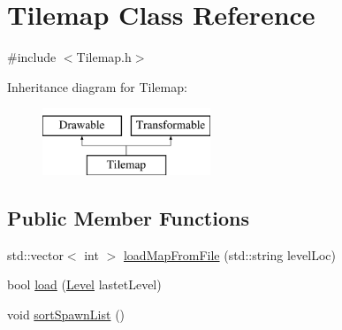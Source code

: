 \hypertarget{class_tilemap}{}\section{Tilemap Class Reference}
\label{class_tilemap}


{\ttfamily \#include $<$Tilemap.\+h$>$}

Inheritance diagram for Tilemap\+:\begin{figure}[H]
\begin{center}
\leavevmode
\includegraphics[height=2.000000cm]{class_tilemap}
\end{center}
\end{figure}
\subsection*{Public Member Functions}
\begin{DoxyCompactItemize}
\item 
std\+::vector$<$ int $>$ \hyperlink{class_tilemap_aaf6018db69a5590cd7346bd4de98fc35}{load\+Map\+From\+File} (std\+::string level\+Loc)
\item 
bool \hyperlink{class_tilemap_a20ae966645360ac69d313811539dcbcc}{load} (\hyperlink{class_level}{Level} lastet\+Level)
\item 
void \hyperlink{class_tilemap_aa987cd1aa8ebf71dbe2333dafe2b4039}{sort\+Spawn\+List} ()
\end{DoxyCompactItemize}

